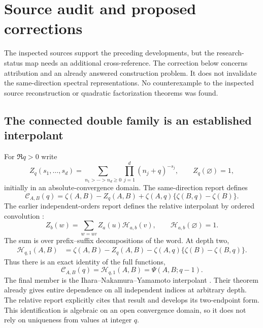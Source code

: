 \section{Source audit and proposed corrections}
\label{sec:audit}

The inspected sources support the preceding developments, but the
research-status map needs an additional cross-reference.  The correction
below concerns attribution and an already answered construction problem.
It does not invalidate the same-direction spectral representations.
No counterexample to the inspected source reconstruction or quadratic
factorization theorems was found.

\subsection{The connected double family is an established interpolant}

For $\Re q>0$ write
\[
 Z_q(s_1,\ldots,s_d)=
  \sum_{n_1>\cdots>n_d\ge0}\prod_{j=1}^d(n_j+q)^{-s_j},
 \qquad Z_q(\varnothing)=1,
\]
initially in an absolute-convergence domain.  The same-direction report
defines
\begin{equation}\label{audit:connected}
 \mathcal C_{A,B}(q)=\zeta(A,B)-Z_q(A,B)
                      +\zeta(A,q)\{\zeta(B,q)-\zeta(B)\}.
\end{equation}
The earlier independent-orders report defines the relative interpolant
by ordered convolution \cite{IndependentOrders}:
\begin{equation}\label{audit:relative}
 Z_b(w)=\sum_{w=uv}Z_a(u)\mathcal H_{a,b}(v),
 \qquad \mathcal H_{a,b}(\varnothing)=1.
\end{equation}
The sum is over prefix--suffix decompositions of the word.  At depth two,
\begin{align*}
 \mathcal H_{q,1}(A,B)
 &=\zeta(A,B)-Z_q(A,B)
                  -\zeta(A,q)\{\zeta(B)-\zeta(B,q)\}.
\end{align*}
Thus there is an exact identity of the full functions,
\begin{equation}\label{audit:identification}
 \boxed{\mathcal C_{A,B}(q)=\mathcal H_{q,1}(A,B)
                              =\Psi(A,B;q-1).}
\end{equation}
The final member is the Ihara--Nakamura--Yamamoto interpolant
\cite[Proposition 2.1 and Corollary 4.2]{INY}.  Their theorem already
gives entire dependence on all independent indices at arbitrary depth.
The relative report explicitly cites that result and develops its
two-endpoint form.  This identification is algebraic on an open
convergence domain, so it does not rely on uniqueness from values at
integer $q$.

